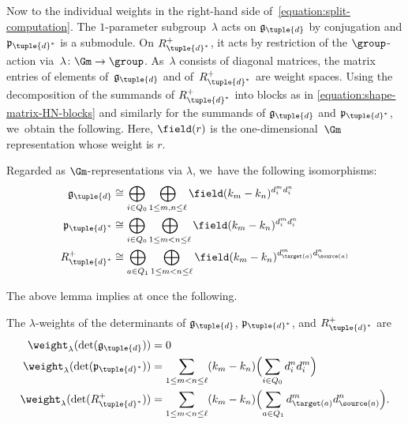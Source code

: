 Now to the individual weights in the right-hand side of~\eqref{equation:split-computation}.
The $1$-parameter subgroup~$\lambda$ acts on $\mathfrak{g}_{\tuple{d}}$ by conjugation
and $\mathfrak{p}_{\tuple{d}^*}$ is a submodule.
On $R_{\tuple{d}^*}^+$,
it acts by restriction of the $\group$-action via~$\lambda\colon \Gm \to \group$.
As~$\lambda$ consists of diagonal matrices,
the matrix entries of elements of~$\mathfrak{g}_{\tuple{d}}$
and of~$R_{\tuple{d}^*}^+$ are weight spaces.
Using the decomposition of the summands of $R_{\tuple{d}^*}^+$
into blocks as in \eqref{equation:shape-matrix-HN-blocks}
and similarly for the summands of $\mathfrak{g}_{\tuple{d}}$ and $\mathfrak{p}_{\tuple{d}^*}$, we~obtain the following.
Here, $\field(r)$ is the one-dimensional~$\Gm$\dash representation
whose weight is $r$.
\begin{lemma}
\label{lemma:weights-fibers}
Regarded as $\Gm$-representations via $\lambda$, we~have the following isomorphisms:
\begin{align*}
\mathfrak{g}_{\tuple{d}} &\cong \bigoplus_{i \in Q_0} \bigoplus_{1 \leq m,n \leq \ell} \field(k_m-k_n)^{d_i^md_i^n} \\
\mathfrak{p}_{\tuple{d}^*} &\cong \bigoplus_{i \in Q_0} \bigoplus_{1 \leq m<n \leq \ell} \field(k_m-k_n)^{d_i^md_i^n} \\
R_{\tuple{d}^*}^+ &\cong \bigoplus_{a \in Q_1} \bigoplus_{1 \leq m < n \leq \ell} \field(k_m-k_n)^{d_{\target(a)}^md_{\source(a)}^n}
\end{align*}
\end{lemma}
The above lemma implies at once the following.
\begin{lemma}
\label{lemma:weights-determinants}
The $\lambda$-weights of the determinants of $\mathfrak{g}_{\tuple{d}}$, $\mathfrak{p}_{\tuple{d}^*}$, and $R_{\tuple{d}^*}^+$ are
\begin{align*}
\weight_\lambda(\det(\mathfrak{g}_{\tuple{d}})) &= 0 \\
\weight_\lambda(\det(\mathfrak{p}_{\tuple{d}^*})) &= \sum_{1 \leq m < n \leq \ell} (k_m - k_n) \Bigl(\sum_{i \in Q_0} d_i^n d_i^m\Bigr) \\
\weight_\lambda(\det(R_{\tuple{d}^*}^+)) &= \sum_{1 \leq m < n \leq \ell} (k_m - k_n) \Bigl(\sum_{a\in Q_1} d_{\target(a)}^m d_{\source(a)}^n\Bigr).
\end{align*}
\end{lemma}

